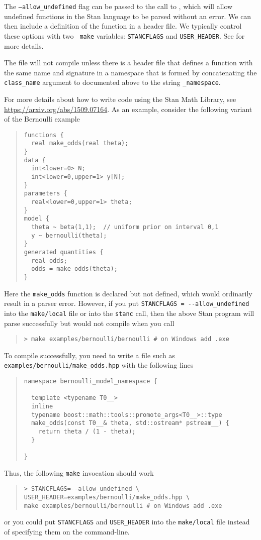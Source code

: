 The {\tt --allow\_undefined} flag can be passed to the call to \stanc,
which will allow undefined functions in the Stan language to be parsed
without an error. We can then include a definition of the function in
a \Cpp header file. We typically control these options with two {\tt
  make} variables: \Verb|STANCFLAGS| and \Verb|USER_HEADER|. See
 for more details.

The \Cpp file will not compile unless there is a header file that
defines a function with the same name and signature in a namespace
that is formed by concatenating the {\tt class\_name} argument to
\stanc documented above to the string {\tt \_namespace}.

For more details about how to write \Cpp code using the Stan Math
Library, see \url{https://arxiv.org/abs/1509.07164}. As an example,
consider the following variant of the Bernoulli example
%
\begin{quote}
\begin{Verbatim}
functions {
  real make_odds(real theta);
}
data {
  int<lower=0> N;
  int<lower=0,upper=1> y[N];
}
parameters {
  real<lower=0,upper=1> theta;
}
model {
  theta ~ beta(1,1);  // uniform prior on interval 0,1
  y ~ bernoulli(theta);
}
generated quantities {
  real odds;
  odds = make_odds(theta);
}
\end{Verbatim}
\end{quote}
%
Here the {\tt make\_odds} function is declared but not defined,
which would ordinarily result in a parser error. However, if you
put \Verb|STANCFLAGS = --allow_undefined| into the
{\tt make/local} file or into the {\tt stanc} call, then the above 
Stan program will parse successfully but would not compile when you 
call
%
\begin{quote}
\begin{Verbatim}[fontshape=sl]
> make examples/bernoulli/bernoulli # on Windows add .exe 
\end{Verbatim}
\end{quote}
%
To compile successfully, you need to write a file such as {\tt
examples/bernoulli/make\_odds.hpp} with the following lines
%
\begin{quote}
\begin{Verbatim}
namespace bernoulli_model_namespace {

  template <typename T0__>
  inline
  typename boost::math::tools::promote_args<T0__>::type
  make_odds(const T0__& theta, std::ostream* pstream__) {
    return theta / (1 - theta);
  }

}
\end{Verbatim}
\end{quote}
%
Thus, the following {\tt make} invocation should work
%
\begin{quote}
\begin{Verbatim}[fontshape=sl]
> STANCFLAGS=--allow_undefined \
USER_HEADER=examples/bernoulli/make_odds.hpp \
make examples/bernoulli/bernoulli # on Windows add .exe 
\end{Verbatim}
\end{quote}
%
or you could put \Verb|STANCFLAGS| and \Verb|USER_HEADER|
into the {\tt make/local} file instead of specifying them
on the command-line.

